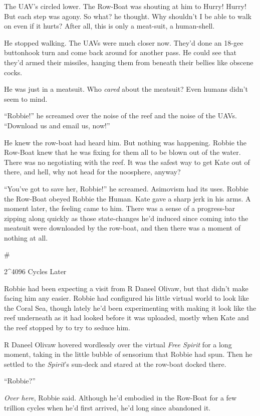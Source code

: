 The UAV’s circled lower. The Row-Boat was shouting at him to Hurry!
Hurry! But each step was agony. So what? he thought. Why shouldn’t
I be able to walk on even if it hurts? After all, this is only a
meat-suit, a human-shell.

He stopped walking. The UAVs were much closer now. They’d done an
18-gee buttonhook turn and come back around for another pass. He
could see that they’d armed their missiles, hanging them from
beneath their bellies like obscene cocks.

He was just in a meatsuit. Who \emph{cared} about the meatsuit?
Even humans didn’t seem to mind.

“Robbie!” he screamed over the noise of the reef and the noise of
the UAVs. “Download us and email us, now!”

He knew the row-boat had heard him. But nothing was happening.
Robbie the Row-Boat knew that he was fixing for them all to be
blown out of the water. There was no negotiating with the reef. It
was the safest way to get Kate out of there, and hell, why not head
for the noosphere, anyway?

“You’ve got to save her, Robbie!” he screamed. Asimovism had its
uses. Robbie the Row-Boat obeyed Robbie the Human. Kate gave a
sharp jerk in his arms. A moment later, the feeling came to him.
There was a sense of a progress-bar zipping along quickly as those
state-changes he’d induced since coming into the meatsuit were
downloaded by the row-boat, and then there was a moment of nothing
at all.

\#

2\^{}4096 Cycles Later

Robbie had been expecting a visit from R Daneel Olivaw, but that
didn’t make facing him any easier. Robbie had configured his little
virtual world to look like the Coral Sea, though lately he’d been
experimenting with making it look like the reef underneath as it
had looked before it was uploaded, mostly when Kate and the reef
stopped by to try to seduce him.

R Daneel Olivaw hovered wordlessly over the virtual
\emph{Free Spirit} for a long moment, taking in the little bubble
of sensorium that Robbie had spun. Then he settled to the
\emph{Spirit}’s sun-deck and stared at the row-boat docked there.

“Robbie?”

\emph{Over here}, Robbie said. Although he’d embodied in the
Row-Boat for a few trillion cycles when he’d first arrived, he’d
long since abandoned it.

